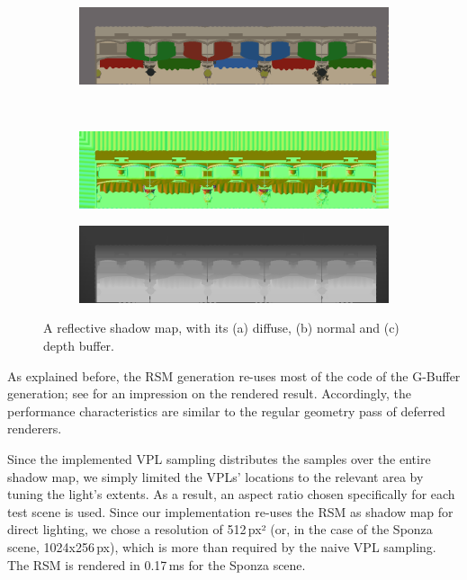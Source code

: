 \begin{figure}[htb]
    \centering
    \begin{subfigure}[b]{1.0\textwidth}
        \centering
        \includegraphics[width=1.0\linewidth]{screenshots/RSM_diffuse}%
        \caption{}
    \end{subfigure}\\
    \par\medskip
    \begin{subfigure}[b]{0.49\textwidth}
        \centering
        \includegraphics[width=1.0\linewidth]{screenshots/RSM_normal}%
        \caption{}
    \end{subfigure}%
    \hfill
    \begin{subfigure}[b]{0.49\textwidth}
        \centering
        \includegraphics[width=1.0\linewidth]{screenshots/RSM_depth}%
        \caption{}
    \end{subfigure}%
    \caption{A reflective shadow map, with its (a) diffuse, (b) normal and (c) depth buffer.}
    \label{fig:results:RSMBuffers}%
\end{figure}%


As explained before, the RSM generation re-uses most of the code of the G-Buffer generation; see  for an impression on the rendered result. Accordingly, the performance characteristics are similar to the regular geometry pass of deferred renderers.

Since the implemented VPL sampling distributes the samples over the entire shadow map, we simply limited the VPLs' locations to the relevant area by tuning the light's extents. As a result, an aspect ratio chosen specifically for each test scene is used. Since our implementation re-uses the RSM as shadow map for direct lighting, we chose a resolution of 512\,px² (or, in the case of the Sponza scene, 1024x256\,px), which is more than required by the naive VPL sampling. The RSM is rendered in 0.17\,ms for the Sponza scene.

